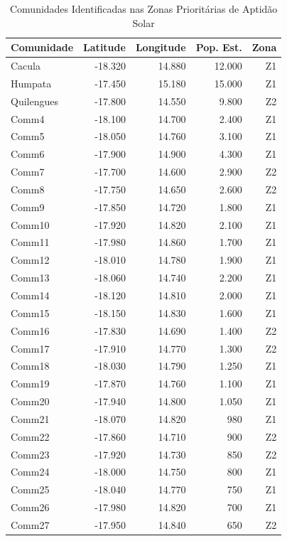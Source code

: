 \documentclass[12pt, a4paper]{article}
\begin{document}
\begin{itemize}
\begin{table}[H]
\centering
\caption{Comunidades Identificadas nas Zonas Prioritárias de Aptidão Solar}
\label{tab:communities}
\footnotesize
\begin{tabular}{|l|r|r|r|r|}
\hline
\textbf{Comunidade} & \textbf{Latitude} & \textbf{Longitude} & \textbf{Pop. Est.} & \textbf{Zona} \\
\hline
Cacula & -18.320 & 14.880 & 12.000 & Z1 \\
Humpata & -17.450 & 15.180 & 15.000 & Z1 \\
Quilengues & -17.800 & 14.550 & 9.800 & Z2 \\
Comm4 & -18.100 & 14.700 & 2.400 & Z1 \\
Comm5 & -18.050 & 14.760 & 3.100 & Z1 \\
Comm6 & -17.900 & 14.900 & 4.300 & Z1 \\
Comm7 & -17.700 & 14.600 & 2.900 & Z2 \\
Comm8 & -17.750 & 14.650 & 2.600 & Z2 \\
Comm9 & -17.850 & 14.720 & 1.800 & Z1 \\
Comm10 & -17.920 & 14.820 & 2.100 & Z1 \\
Comm11 & -17.980 & 14.860 & 1.700 & Z1 \\
Comm12 & -18.010 & 14.780 & 1.900 & Z1 \\
Comm13 & -18.060 & 14.740 & 2.200 & Z1 \\
Comm14 & -18.120 & 14.810 & 2.000 & Z1 \\
Comm15 & -18.150 & 14.830 & 1.600 & Z1 \\
Comm16 & -17.830 & 14.690 & 1.400 & Z2 \\
Comm17 & -17.910 & 14.770 & 1.300 & Z2 \\
Comm18 & -18.030 & 14.790 & 1.250 & Z1 \\
Comm19 & -17.870 & 14.760 & 1.100 & Z1 \\
Comm20 & -17.940 & 14.800 & 1.050 & Z1 \\
Comm21 & -18.070 & 14.820 & 980 & Z1 \\
Comm22 & -17.860 & 14.710 & 900 & Z2 \\
Comm23 & -17.920 & 14.730 & 850 & Z2 \\
Comm24 & -18.000 & 14.750 & 800 & Z1 \\
Comm25 & -18.040 & 14.770 & 750 & Z1 \\
Comm26 & -17.980 & 14.820 & 700 & Z1 \\
Comm27 & -17.950 & 14.840 & 650 & Z2 \\

\end{tabular}
\end{table}
\end{itemize}
\end{document}
